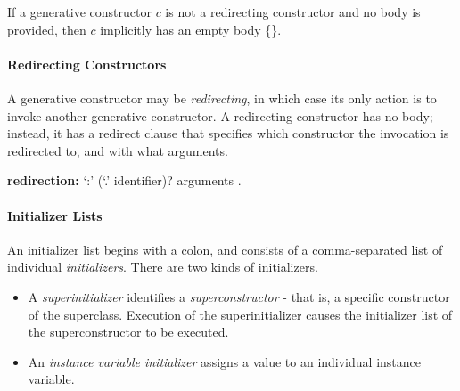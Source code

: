 \documentclass{article}
\newcommand{\code}[1]{{\sf #1}}
\begin{document}

\LMHash{}
If a generative constructor $c$  is not a redirecting constructor and no body is provided, then $c$ implicitly has an empty body \code{\{\}}.


\paragraph{Redirecting Constructors}

\LMHash{}
A generative constructor may be {\em redirecting}, in which case its only action is to invoke another generative constructor.  A redirecting constructor has no body; instead, it has a redirect clause that specifies which constructor the invocation is redirected to, and with what arguments.

\begin{grammar}
{\bf redirection:}
     `{\escapegrammar :}' \THIS{} (`{\escapegrammar .}' identifier)? arguments
    .
\end{grammar}




\paragraph{Initializer Lists}

\LMHash{}
An initializer list begins with a colon, and consists of a comma-separated list of individual {\em initializers}. There are two kinds of initializers.
\begin{itemize}
\item A {\em superinitializer} identifies a {\em superconstructor} - that is, a specific  constructor of the superclass.  Execution of the superinitializer causes the initializer list of the superconstructor to be executed.

\item An {\em instance variable initializer} assigns a value to an individual instance variable.
\end{itemize}
\end{document}
